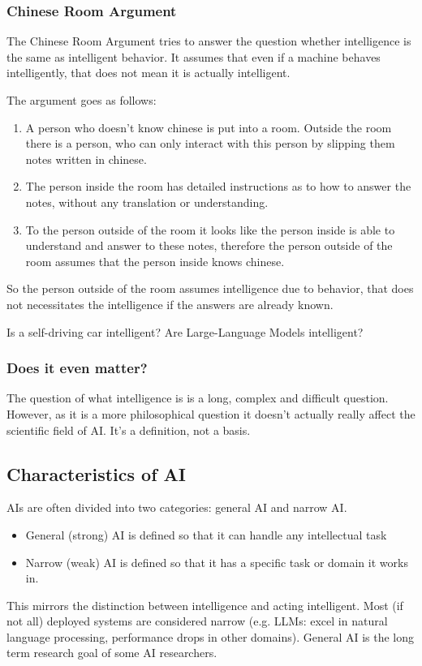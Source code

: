 \documentclass[
../EiKI_Summary.tex,
]
{subfiles}
\begin{document}
\subsubsection{Chinese Room Argument}
The Chinese Room Argument tries to answer the question whether intelligence is the same as intelligent behavior. It assumes that even if a machine behaves intelligently, that does not mean it is actually intelligent.

The argument goes as follows:
\begin{enumerate}
    \item A person who doesn't know chinese is put into a room. Outside the room there is a person, who can only interact with this person by slipping them notes written in chinese.
    \item The person inside the room has detailed instructions as to how to answer the notes, without any translation or understanding. 
    \item To the person outside of the room it looks like the person inside is able to understand and answer to these notes, therefore the person outside of the room assumes that the person inside knows chinese.
\end{enumerate}

So the person outside of the room assumes intelligence due to behavior, that does not necessitates the intelligence if the answers are already known.

Is a self-driving car intelligent? Are Large-Language Models intelligent?

\subsubsection{Does it even matter?}
The question of what intelligence is is a long, complex and difficult question. However, as it is a more philosophical question it doesn't actually really affect the scientific field of AI. It's a definition, not a basis.

\subsection{Characteristics of AI}

AIs are often divided into two categories: general AI and narrow AI. 

\begin{defbox}
    \begin{itemize}
        \item General (strong) AI is defined so that it can handle any intellectual task
        \item Narrow (weak) AI is defined so that it has a specific task or domain it works in.
    \end{itemize}
    This mirrors the distinction between intelligence and acting intelligent.
    Most (if not all) deployed systems are considered narrow (e.g. LLMs: excel in natural language processing, performance drops in other domains). General AI is the long term research goal of some AI researchers. 
\end{defbox}
\end{document}
